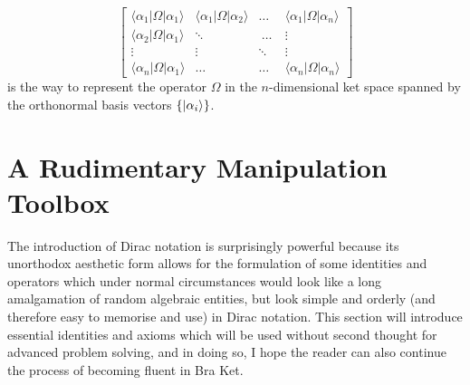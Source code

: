 $$
\begin{bmatrix}
\langle{\alpha_{1}}|\Omega|{\alpha}_{1}\rangle & \langle{\alpha_{1}}|\Omega|{\alpha}_{2}\rangle &
\dots & \langle{\alpha_{1}}|\Omega|{\alpha}_{n}\rangle\\ 
\langle{\alpha_{2}}|\Omega|{\alpha}_{1}\rangle & \ddots &
\:\dots\: & \vdots \\
\vdots & \vdots & \ddots & \vdots\\ 
\langle{\alpha_{n}}|\Omega|{\alpha}_{1}\rangle & \dots & \dots & \langle{\alpha_{n}}|\Omega|{\alpha}_{n}\rangle
\end{bmatrix}
$$
is the way to represent the operator $\Omega$ in the $n$-dimensional ket space spanned by the orthonormal basis vectors $\{|\alpha_{i}\rangle\}$.
\section{A Rudimentary Manipulation Toolbox}
The introduction of Dirac notation is surprisingly powerful because its unorthodox aesthetic form allows for the formulation of some identities and operators which under normal circumstances would look like a long amalgamation of random algebraic entities, but look simple and orderly (and therefore easy to memorise and use) in Dirac notation. This section will introduce essential identities and axioms which will be used without second thought for advanced problem solving, and in doing so, I hope the reader can also continue the process of becoming fluent in Bra Ket.
